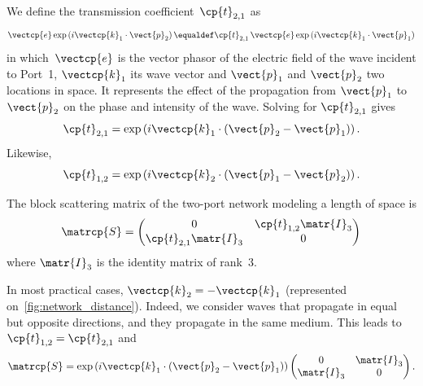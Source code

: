 \begin{refsection}
We define the transmission coefficient~$\cp{t}_{2,1}$ as
\begin{equation}
    \vectcp{e} \exp\left(i \vectcp{k}_1 \cdot \vect{p}_2\right)
    \equaldef
    \cp{t}_{2,1}\,
    \vectcp{e} \exp\left(i \vectcp{k}_1 \cdot \vect{p}_1\right)
\end{equation}
in which~$\vectcp{e}$ is the vector phasor of the electric field of the wave incident to Port~1,
$\vectcp{k}_1$ its wave vector
and $\vect{p}_1$ and $\vect{p}_2$ two locations in space.
It represents the effect of the propagation from $\vect{p}_1$ to $\vect{p}_2$ on the phase and intensity of the wave.
Solving for $\cp{t}_{2,1}$ gives
\begin{equation}
    \cp{t}_{2,1} = \exp\left(i \vectcp{k}_1 \cdot (\vect{p}_2 - \vect{p}_1)\right)
    \text{.}
\end{equation}
Likewise,
\begin{equation}
        \cp{t}_{1,2}
        = \exp\left(i \vectcp{k}_2 \cdot (\vect{p}_1 - \vect{p}_2)\right)
        \text{.}
\end{equation}

The block scattering matrix of the two-port network modeling a length of space is
\begin{equation}
    \matrcp{S}
    =
    \begin{pmatrix}
        0                       & \cp{t}_{1,2} \matr{I}_3 \\
        \cp{t}_{2,1} \matr{I}_3 & 0                       \\
    \end{pmatrix}
\end{equation}
where $\matr{I}_3$ is the identity matrix of rank~3.

In most practical cases, $\vectcp{k}_2=-\vectcp{k}_1$ (represented on~\cref{fig:network_distance}).
Indeed, we consider waves that propagate in equal but opposite directions, and they propagate in the same medium.
This leads to $\cp{t}_{1,2}=\cp{t}_{2,1}$ and
\begin{equation}
    \matrcp{S}
    =
    \exp\left(i \vectcp{k}_1 \cdot (\vect{p}_2 - \vect{p}_1)\right)
    \begin{pmatrix}
        0                       & \matr{I}_3 \\
        \matr{I}_3 & 0                       \\
    \end{pmatrix}
    \text{.}
\end{equation}




\end{refsection}
